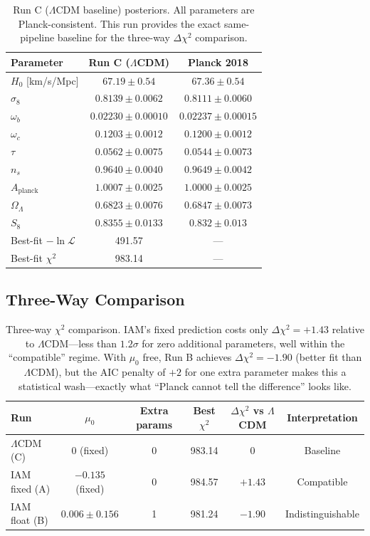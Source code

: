 \documentclass[11pt,letterpaper]{article}
\begin{document}
\begin{table}[h]
\centering
\begin{tabular}{lcc}
\toprule
Parameter & Run C ($\Lambda$CDM) & Planck 2018 \\
\midrule
$H_0$ [km/s/Mpc] & $67.19 \pm 0.54$ & $67.36 \pm 0.54$ \\
$\sigma_8$ & $0.8139 \pm 0.0062$ & $0.8111 \pm 0.0060$ \\
$\omega_b$ & $0.02230 \pm 0.00010$ & $0.02237 \pm 0.00015$ \\
$\omega_c$ & $0.1203 \pm 0.0012$ & $0.1200 \pm 0.0012$ \\
$\tau$ & $0.0562 \pm 0.0075$ & $0.0544 \pm 0.0073$ \\
$n_s$ & $0.9640 \pm 0.0040$ & $0.9649 \pm 0.0042$ \\
$A_\mathrm{planck}$ & $1.0007 \pm 0.0025$ & $1.0000 \pm 0.0025$ \\
\midrule
$\Omega_\Lambda$ & $0.6823 \pm 0.0076$ & $0.6847 \pm 0.0073$ \\
$S_8$ & $0.8355 \pm 0.0133$ & $0.832 \pm 0.013$ \\
\midrule
Best-fit $-\ln\mathcal{L}$ & 491.57 & --- \\
Best-fit $\chi^2$ & 983.14 & --- \\
\bottomrule
\end{tabular}
\caption{Run C ($\Lambda$CDM baseline) posteriors. All parameters are Planck-consistent. This run provides the exact same-pipeline baseline for the three-way $\Delta\chi^2$ comparison.}
\label{tab:runC}
\end{table}

\subsection{Three-Way Comparison}

\begin{table}[h]
\centering
\begin{tabular}{lccccc}
\toprule
Run & $\mu_0$ & Extra params & Best $\chi^2$ & $\Delta\chi^2$ vs $\Lambda$CDM & Interpretation \\
\midrule
$\Lambda$CDM (C) & 0 (fixed) & 0 & 983.14 & 0 & Baseline \\
IAM fixed (A) & $-0.135$ (fixed) & 0 & 984.57 & $+1.43$ & Compatible \\
IAM float (B) & $0.006 \pm 0.156$ & 1 & 981.24 & $-1.90$ & Indistinguishable \\
\bottomrule
\end{tabular}
\caption{Three-way $\chi^2$ comparison. IAM's fixed prediction costs only $\Delta\chi^2 = +1.43$ relative to $\Lambda$CDM---less than $1.2\sigma$ for zero additional parameters, well within the ``compatible'' regime. With $\mu_0$ free, Run B achieves $\Delta\chi^2 = -1.90$ (better fit than $\Lambda$CDM), but the AIC penalty of $+2$ for one extra parameter makes this a statistical wash---exactly what ``Planck cannot tell the difference'' looks like.}
\label{tab:comparison}
\end{table}
\end{document}
